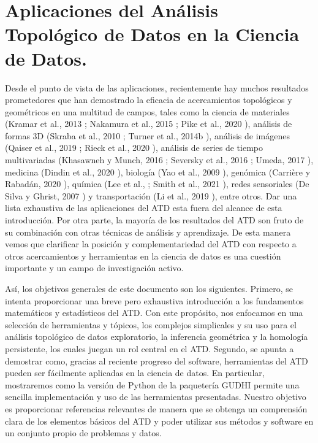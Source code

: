 \section*{Aplicaciones del An\'alisis Topol\'ogico de Datos en la Ciencia de Datos.}

Desde el punto de vista de las aplicaciones, recientemente hay muchos resultados prometedores que han
demostrado la eficacia de acercamientos topol\'ogicos y geom\'etricos en una multitud de campos, tales
como la ciencia de materiales (Kramar et al., 2013 \cite{Kramar2013}; Nakamura
et al., 2015 \cite{Nakamura2015}; Pike et al., 2020 \cite{Pike2020}), an\'alisis de
formas 3D (Skraba et al., 2010 \cite{Skraba2010}; Turner et al., 2014b \cite{Turner2014b}), an\'alisis
de im\'agenes (Qaiser et al., 2019 \cite{Qaiser2019}; Rieck et al., 2020 \cite{Rieck2020}), an\'alisis
de series de tiempo multivariadas (Khasawneh y Munch, 2016 \cite{Khasawneh2016};
Seversky et al., 2016 \cite{Seversky2016}; Umeda, 2017 \cite{Umeda2017}),
medicina (Dindin et al., 2020 \cite{Dindin2020}), biolog\'ia (Yao et al., 2009 \cite{Yao2009}),
gen\'omica (Carri\`ere y Rabad\'an, 2020 \cite{Carriere2020}), qu\'imica (Lee et al.,
\cite{Lee2017}; Smith et al., 2021 \cite{Smith2021}), redes sensoriales (De Silva y Ghrist, 2007
\cite{Silva2007}) y transportaci\'on (Li et al., 2019 \cite{Li2019}), entre otros. Dar una lista
exhaustiva de las aplicaciones del ATD esta fuera del alcance de esta introducci\'on. Por otra parte,
la mayor\'ia de los resultados del ATD son fruto de su combinaci\'on con otras t\'ecnicas de an\'alisis
y aprendizaje. De esta manera vemos que clarificar la posici\'on y complementariedad del ATD con respecto
a otros acercamientos y herramientas en la ciencia de datos es una cuesti\'on importante y un campo de
investigaci\'on activo.

As\'i, los objetivos generales de este documento son los siguientes. Primero, se intenta proporcionar
una breve pero exhaustiva introducci\'on a los fundamentos matem\'aticos
y estad\'isticos del ATD. Con este prop\'osito, nos enfocamos en una selecci\'on de herramientas
y t\'opicos, los complejos simplicales y su uso para el an\'alisis topol\'ogico de datos exploratorio,
la inferencia geom\'etrica  y la homolog\'ia persistente, los cuales juegan un rol central en el ATD.
Segundo, se apunta a demostrar como, gracias al reciente progreso del software, herramientas del ATD
pueden ser f\'acilmente aplicadas en la ciencia de datos. En particular, mostraremos como la versi\'on
de Python de la paqueter\'ia GUDHI permite una sencilla implementaci\'on y uso de las herramientas
presentadas. Nuestro objetivo es proporcionar referencias relevantes de manera que
se obtenga un comprensi\'on clara de los elementos b\'asicos del ATD y poder utilizar sus
m\'etodos y software en un conjunto propio de problemas y datos.

